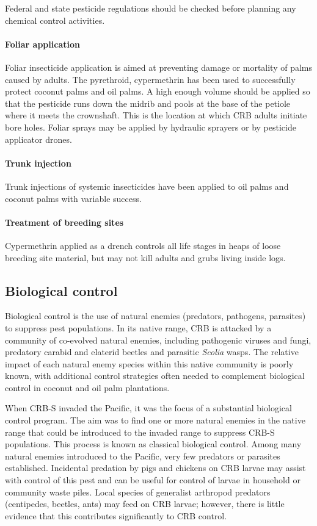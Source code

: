 \documentclass[twocolumn,letterpaper]{scrartcl}
\begin{document}
Federal and state pesticide regulations should be checked before planning any chemical control activities.

\paragraph{Foliar application}
Foliar insecticide application is aimed at preventing damage or mortality of palms caused by adults. The pyrethroid, cypermethrin has been used to successfully protect coconut palms and oil palms. A high enough volume should be applied so that the pesticide runs down the midrib and pools at the base of the petiole where it meets the crownshaft. This is the location at which CRB adults initiate bore holes. Foliar sprays may be applied by hydraulic sprayers or by pesticide applicator drones.  

\paragraph{Trunk injection}
Trunk injections of systemic insecticides have been applied to oil palms and coconut palms with variable success.

\paragraph{Treatment of breeding sites}
Cypermethrin applied as a drench controls all life stages in heaps of loose breeding site material, but may not kill adults and grubs living inside logs.

\subsection{Biological control}

Biological control is the use of natural enemies (predators, pathogens, parasites) to suppress pest populations. In its native range, CRB is attacked by a community of co-evolved natural enemies, including pathogenic viruses and fungi, predatory carabid and elaterid beetles  and  parasitic  \textit{Scolia}  wasps.  The  relative  impact  of  each  natural  enemy  species  within  this  native community is poorly known, with additional control strategies often needed to complement biological control in coconut and oil palm plantations.

When CRB-S invaded the Pacific, it was the focus of a substantial biological control  program.  The  aim was to find one or more natural enemies in the native range that could be introduced to the invaded range to  suppress  CRB-S  populations.  This  process  is  known  as  classical  biological  control. Among many natural enemies introduced to the Pacific, very few predators or parasites established. Incidental predation by pigs and chickens on CRB larvae may assist with control of this pest and can be useful for control of larvae in household or community waste piles. Local species of generalist arthropod predators (centipedes, beetles, ants) may feed on CRB larvae; however, there is 
little evidence that this contributes significantly to CRB control. 
\end{document}
